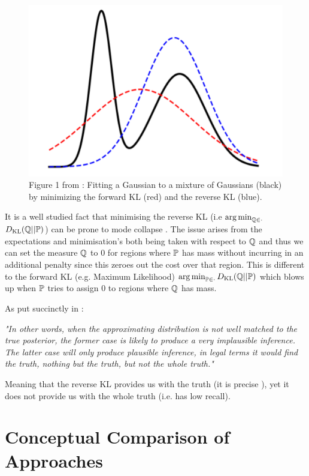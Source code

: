 \documentclass[a4paper,12pt,twoside,openright]{report}
\theoremstyle{definition}
\begin{document}
\begin{figure}
    \centering
    \includegraphics[scale=0.5]{images/zhang_et_al.PNG}
    \caption{Figure 1 from \cite{zhang2019variational}:  Fitting a Gaussian to a mixture of Gaussians (black) by
minimizing the forward KL (red) and the reverse KL (blue).}
    \label{fig:babrber_kl}
\end{figure}

It is a well studied fact that minimising the reverse KL (i.e $\argmin_{\Q \in \cdot }$ $\KL(\Q ||\P)$) can be prone to mode collapse \citep{zhang2019variational}. The issue arises from the expectations and minimisation's both being taken with respect to $\Q$ and thus we can set the measure $\Q$ to 0 for regions where $\P$ has mass without incurring in an additional penalty since this zeroes out the cost over that region. This is different to the forward KL (e.g. Maximum Likelihood)  $\argmin_{\P \in \cdot }\KL(\Q ||\P)$  which blows up  when $\P$ tries to assign $0$ to regions where $\Q$ has mass.

As put succinctly in \cite{lawrence2001variational}:

\textit{"In other words, when the approximating distribution is not
well matched to the true posterior, the former case is likely to produce a very implausible inference.
The latter case will only produce plausible inference, in legal terms it would find the truth, nothing
but the truth, but not the whole truth."}

Meaning that the reverse KL provides us with the truth (it is precise ), yet  it does not provide us with the whole truth (i.e. has low recall).

\section{Conceptual Comparison of Approaches}
\end{document}
